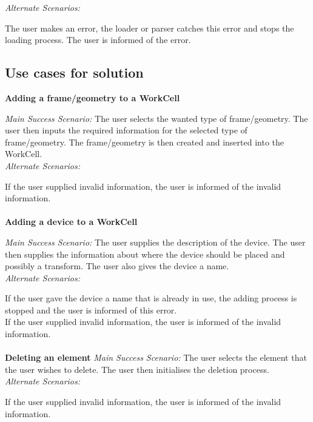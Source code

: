 \noindent\textit{Alternate Scenarios: }

\noindent The user makes an error, the loader or parser catches this error and stops the loading process. The user is informed of the error.\\

\clearpage
\subsection{Use cases for solution}

\noindent\textbf{Adding a frame/geometry to a WorkCell}

\noindent\textit{Main Success Scenario: }The user selects the wanted type of frame/geometry. The user then inputs the required information for the selected type of frame/geometry. The frame/geometry is then created and inserted into the WorkCell.\\

\noindent\textit{Alternate Scenarios:}

\noindent If the user supplied invalid information, the user is informed of the invalid information.\\
\\

\noindent\textbf{Adding a device to a WorkCell}

\noindent\textit{Main Success Scenario:} The user supplies the description of the device. The user then supplies the information about where the device should be placed and possibly a transform. The user also gives the device a name.\\

\noindent\textit{Alternate Scenarios:}

\noindent If the user gave the device a name that is already in use, the adding process is stopped and the user is informed of this error.\\

\noindent If the user supplied invalid information, the user is informed of the invalid information.\\
\\

\noindent\textbf{Deleting an element}
\noindent\textit{Main Success Scenario:} The user selects the element that the user wishes to delete. The user then initialises the deletion process.\\

\noindent\textit{Alternate Scenarios:}

\noindent If the user supplied invalid information, the user is informed of the invalid information.